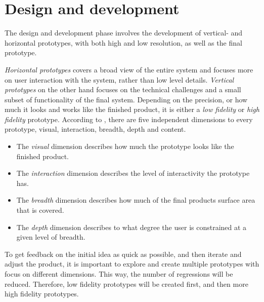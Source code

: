 \documentclass{report}
\begin{document}
\section{Design and development}
\label{design-development}


The design and development phase involves the development of vertical- and horizontal prototypes, with both high and low resolution, as well as the final prototype. 

\textit{Horizontal prototypes} covers a broad view of the entire system and focuses more on user interaction with the system, rather than low level details. \textit{Vertical prototypes} on the other hand focuses on the technical challenges and a small subset of functionality of the final system. Depending on the precision, or how much it looks and works like the finished product, it is either a \textit{low fidelity} or \textit{high fidelity} prototype. According to \cite{prototype-dimensions}, there are five independent dimensions to every prototype, visual, interaction, breadth, depth and content.

\begin{itemize}
    \item The \textit{visual} dimension describes how much the prototype looks like the finished product. 
    
    \item The \textit{interaction} dimension describes the level of interactivity the prototype has. 
    
    \item The \textit{breadth} dimension describes how much of the final products surface area that is covered. 
    
    \item The \textit{depth} dimension describes to what degree the user is constrained at a given level of breadth.
\end{itemize}

To get feedback on the initial idea as quick as possible, and then iterate and adjust the product, it is important to explore and create multiple prototypes with focus on different dimensions. This way, the number of regressions will be reduced. Therefore, low fidelity prototypes will be created first, and then more high fidelity prototypes.
\end{document}
